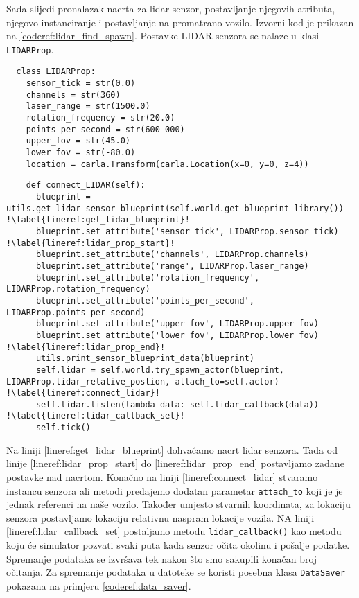 Sada slijedi pronalazak nacrta za lidar senzor, postavljanje njegovih atributa, njegovo instanciranje i postavljanje na promatrano vozilo. Izvorni kod je prikazan na \ref{coderef:lidar_find_spawn}. Postavke LIDAR senzora se nalaze u klasi \texttt{LIDARProp}.


\begin{listing}[!ht]
  \begin{verbatim}
  class LIDARProp:
    sensor_tick = str(0.0)
    channels = str(360)
    laser_range = str(1500.0)
    rotation_frequency = str(20.0)
    points_per_second = str(600_000)
    upper_fov = str(45.0)
    lower_fov = str(-80.0)
    location = carla.Transform(carla.Location(x=0, y=0, z=4))
  \end{verbatim}
  \caption{LIDAR atributi}
  \label{coderef:lidar_props}
\end{listing}

\begin{listing}[!ht]
  \begin{verbatim}
    def connect_LIDAR(self):
      blueprint = utils.get_lidar_sensor_blueprint(self.world.get_blueprint_library()) !\label{lineref:get_lidar_blueprint}!
      blueprint.set_attribute('sensor_tick', LIDARProp.sensor_tick) !\label{lineref:lidar_prop_start}!
      blueprint.set_attribute('channels', LIDARProp.channels)
      blueprint.set_attribute('range', LIDARProp.laser_range)
      blueprint.set_attribute('rotation_frequency', LIDARProp.rotation_frequency)
      blueprint.set_attribute('points_per_second', LIDARProp.points_per_second)
      blueprint.set_attribute('upper_fov', LIDARProp.upper_fov)
      blueprint.set_attribute('lower_fov', LIDARProp.lower_fov) !\label{lineref:lidar_prop_end}!
      utils.print_sensor_blueprint_data(blueprint)
      self.lidar = self.world.try_spawn_actor(blueprint, LIDARProp.lidar_relative_postion, attach_to=self.actor)  !\label{lineref:connect_lidar}!
      self.lidar.listen(lambda data: self.lidar_callback(data))  !\label{lineref:lidar_callback_set}!
      self.tick()
  \end{verbatim}
  \caption{Stvaranje LIDAR senzora}
  \label{coderef:lidar_find_spawn}
\end{listing}

Na liniji \ref{lineref:get_lidar_blueprint} dohvaćamo nacrt lidar senzora. Tada od linije \ref{lineref:lidar_prop_start} do \ref{lineref:lidar_prop_end} postavljamo zadane postavke nad nacrtom. Konačno na liniji \ref{lineref:connect_lidar} stvaramo instancu senzora ali metodi predajemo dodatan parametar \texttt{attach_to} koji je je jednak referenci na naše vozilo. Također umjesto stvarnih koordinata, za lokaciju senzora postavljamo lokaciju relativnu naspram lokacije vozila. NA liniji \ref{lineref:lidar_callback_set} postaljamo metodu \texttt{lidar_callback()} kao metodu koju će simulator pozvati svaki puta kada senzor očita okolinu i pošalje podatke.
Spremanje podataka se izvršava tek nakon što smo sakupili konačan broj očitanja. Za spremanje podataka u datoteke se koristi posebna klasa \texttt{DataSaver} pokazana na primjeru \ref{coderef:data_saver}.

